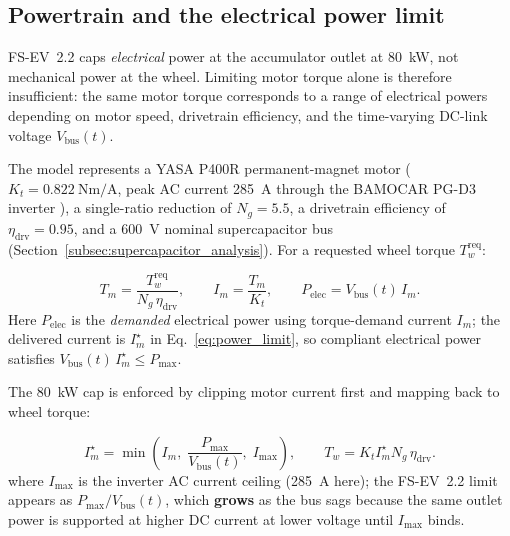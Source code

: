 \subsection{Powertrain and the electrical power limit}
\label{sec:powertrain}

FS-EV~2.2 caps \textit{electrical} power at the accumulator outlet at
\SI{80}{\kilo\watt}, not mechanical power at the wheel. Limiting
motor torque alone is therefore insufficient: the same motor torque
corresponds to a range of electrical powers depending on motor speed,
drivetrain efficiency, and the time-varying DC-link voltage $V_{\mathrm{bus}}(t)$.

The model represents a YASA P400R permanent-magnet motor
($K_t = \SI{0.822}{\newton\metre\per\ampere}$, peak AC current
\SI{285}{\ampere} through the BAMOCAR PG-D3 inverter
\cite{bamocar_pg, yasa_p400r}), a single-ratio reduction of
$N_g = 5.5$, a drivetrain efficiency of $\eta_\text{drv} = 0.95$, and
a \SI{600}{\volt} nominal supercapacitor bus (Section~\ref{subsec:supercapacitor_analysis}). For a
requested wheel torque $T_w^\text{req}$:

\begin{equation}
T_m = \frac{T_w^\text{req}}{N_g \, \eta_\text{drv}},
\qquad
I_m = \frac{T_m}{K_t},
\qquad
P_\text{elec} = V_{\mathrm{bus}}(t)\, I_m.
\label{eq:powertrain_basic}
\end{equation}
Here $P_{\mathrm{elec}}$ is the \emph{demanded} electrical power using torque-demand current $I_m$; the delivered current is $I_m^{\star}$ in Eq.~\ref{eq:power_limit}, so compliant electrical power satisfies $V_{\mathrm{bus}}(t)\,I_m^{\star}\le P_{\max}$.

The \SI{80}{\kilo\watt} cap is enforced by clipping motor current
first and mapping back to wheel torque:

\begin{equation}
I_m^\star = \min\!\left(I_m,\; \frac{P_\text{max}}{V_{\mathrm{bus}}(t)},\; I_\text{max}\right),
\qquad
T_w = K_t I_m^\star N_g \, \eta_\text{drv}.
\label{eq:power_limit}
\end{equation}
where $I_\text{max}$ is the inverter AC current ceiling (\SI{285}{\ampere} here); the FS-EV~2.2 limit appears as $P_\text{max}/V_{\mathrm{bus}}(t)$, which \textbf{grows} as the bus sags because the same outlet power is supported at higher DC current at lower voltage until $I_\text{max}$ binds.

